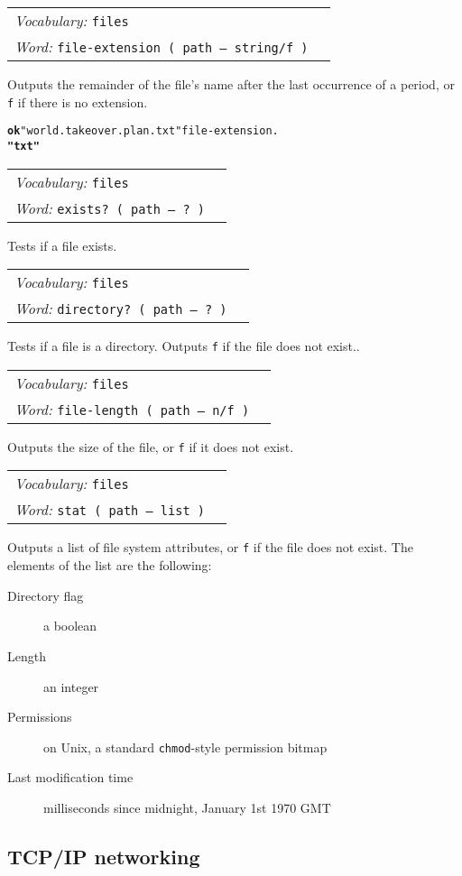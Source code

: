 \documentclass{book}
\newcommand{\vocabulary}[1]{\emph{Vocabulary:} \texttt{#1}&\\}
\newcommand{\ordinaryword}[2]{\index{\texttt{#1}}\emph{Word:} \texttt{#2}&\\}
\newcommand{\wordtable}[1]{


\begin{tabularx}{12cm}{lX}
\hline
#1
\hline
\end{tabularx}

}
\begin{document}
\wordtable{
\vocabulary{files}
\ordinaryword{file-extension}{file-extension~( path -- string/f )}

}
Outputs the remainder of the file's name after the last occurrence of a period, or \texttt{f} if there is no extension.
\begin{alltt}
\textbf{ok} "world.takeover.plan.txt" file-extension .
\textbf{"txt"}
\end{alltt}
\wordtable{
\vocabulary{files}
\ordinaryword{exists?}{exists?~( path -- ?~)}

}
Tests if a file exists.
\wordtable{
\vocabulary{files}
\ordinaryword{directory?}{directory?~( path -- ?~)}

}
Tests if a file is a directory. Outputs \texttt{f} if the file does not exist..
\wordtable{
\vocabulary{files}
\ordinaryword{file-length}{file-length~( path -- n/f~)}

}
Outputs the size of the file, or \texttt{f} if it does not exist.
\wordtable{
\vocabulary{files}
\ordinaryword{stat}{stat~( path -- list~)}

}
Outputs a list of file system attributes, or \texttt{f} if the file does not exist. The elements of the list are the following:
\begin{description}
\item[Directory flag] a boolean
\item[Length] an integer
\item[Permissions] on Unix, a standard \texttt{chmod}-style permission bitmap
\item[Last modification time] milliseconds since midnight, January 1st 1970 GMT
\end{description}

\subsection{TCP/IP networking}
\end{document}
